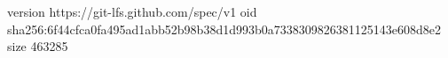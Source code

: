 version https://git-lfs.github.com/spec/v1
oid sha256:6f44cfca0fa495ad1abb52b98b38d1d993b0a7338309826381125143e608d8e2
size 463285
